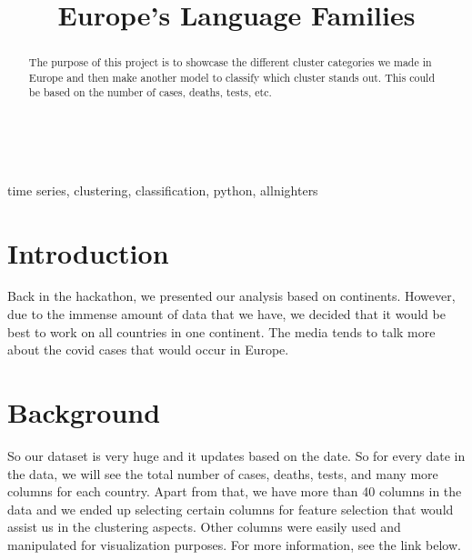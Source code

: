 \documentclass[conference]{IEEEtran}
\begin{document}
\title{Europe's Language Families}\\

\author{
\and
{}
\and
{}
}

\maketitle

\begin{abstract}
The purpose of this project is to showcase the different cluster categories we made in Europe and then make another model to classify which cluster stands out. This could be based on the number of cases, deaths, tests, etc. 
\end{abstract}

\begin{IEEEkeywords}
time series, clustering, classification, python, allnighters
\end{IEEEkeywords}

\section{Introduction}
Back in the hackathon, we presented our analysis based on continents. However, due to the immense amount of data that we have, we decided that it would be best to work on all countries in one continent. The media tends to talk more about the covid cases that would occur in Europe. 

\section{Background}
So our dataset is very huge and it updates based on the date. So for every date in the data, we will see the total number of cases, deaths, tests, and many more columns for each country. Apart from that, we have more than 40 columns in the data and we ended up selecting certain columns for feature selection that would assist us in the clustering aspects. Other columns were easily used and manipulated for visualization purposes. For more information, see the link below. 
\end{document}
